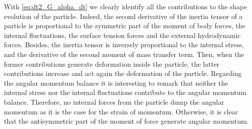 With \ref{eq:dt2_G_alpha_dt} we clearly identify all the contributions to the shape evolution of the particle. 
Indeed, the second derivative of the inertia tensor of a particle is proportional to the symmetric part of the moment of body forces, the internal fluctuations, the surface tension forces and the external hydrodynamic forces. 
Besides, the inertia tensor is inversely proportional to the internal stress, and the derivative of the second moment of mass transfer term. 
Then, when the former contributions generate deformation inside the particle, the latter contributions increase and act again the deformation of the particle.  
Regarding the angular momentum balance it is interesting to remark that neither the internal stress nor the internal fluctuations contribute to the angular momentum balance. 
Therefore, no internal forces from the particle dump the angular momentum as it is the case for the strain of momentum. 
Otherwise, it is clear that the antisymmetric part of the moment of force generate angular momentum.  

